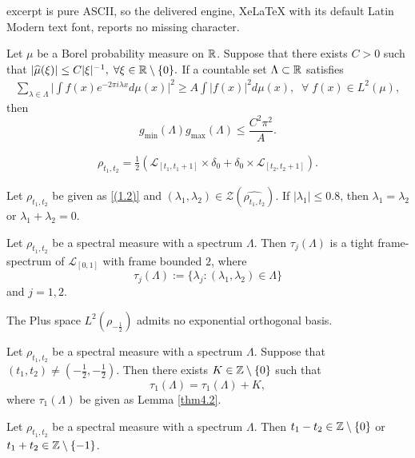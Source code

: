 \documentclass[10pt,a4paper]{amsart}
\begin{document}
excerpt is pure ASCII, so the delivered engine, XeLaTeX with its default Latin Modern text font, reports no missing character.
\begin{thm}\label{thm1.1}
	Let $\mu$ be a Borel probability measure on $\Bbb R$. 
	Suppose that there exists $C>0$ such that \( |\widehat{\mu}(\xi)|\leq C|\xi|^{-1},\;\forall\xi\in\Bbb R\setminus\{0\}. \) 
If a countable set \(\Lambda\subset\Bbb R\) satisfies 
\begin{align}\label{(1.1')}
	\sum_{\lambda\in\Lambda}\Big|\int f(x)e^{-2\pi i\lambda x}d\mu(x)\Big|^2\geq A
	\int |f(x)|^2d\mu(x),\;\;\forall\;f(x)\in L^2(\mu),
\end{align}
then 
	\[
	g_{\min}(\Lambda) g_{\max}(\Lambda)\leq \frac{C^2\pi^2}{A}.
	\] 
\end{thm}

\begin{align}\label{(1.2)}
	\rho_{t_1,t_2}=\frac{1}{2}(\mathcal{L}_{[t_1,t_1+1]}\times\delta_0+\delta_0\times\mathcal{L}_{[t_2,t_2+1]}).
\end{align}

\begin{lem}\label{thm4.1}
Let $\rho_{t_1,t_2}$ be given as \eqref{(1.2)} and  $(\lambda_1,\lambda_2)\in\mathcal{Z}(\widehat{\rho_{t_1,t_2}})$. 
If $|\lambda_1|\leq0.8$, then $\lambda_1=\lambda_2$ or $\lambda_1+\lambda_2=0$. 
\end{lem}

\begin{lem}\label{thm4.2}
	Let $\rho_{t_1,t_2}$ be a spectral measure with a spectrum $\Lambda$. 
	Then $\tau_j(\Lambda)$ is a tight frame-spectrum of $\mathcal{L}_{[0,1]}$ with frame bounded $2$, where $$\tau_j(\Lambda):=\{\lambda_j:(\lambda_1,\lambda_2)\in\Lambda\}  
	$$ and $j=1,2$. 
\end{lem}

\begin{prop}\label{thm4.3}
	The Plus space $L^2(\rho_{-\frac12})$ admits no exponential orthogonal basis. 
\end{prop}

\begin{lem}\label{thm4.4}
		Let $\rho_{t_1,t_2}$ be a spectral measure with a spectrum $\Lambda$. 
		Suppose that $(t_1,t_2)\neq(-\frac12,-\frac12)$.
	Then there exists $K\in\Bbb Z\setminus\{0\}$ such that  $$\tau_1(\Lambda)=\tau_1(\Lambda)+K, 
	$$ 
	where $\tau_1(\Lambda)$ be given as Lemma  \ref{thm4.2}.
\end{lem}

\begin{prop}\label{thm4.5}
		Let $\rho_{t_1,t_2}$ be a spectral measure with a spectrum $\Lambda$. 
 Then $t_1-t_2\in\Bbb Z\setminus\{0\}$ or $t_1+t_2\in\Bbb Z\setminus\{-1\}$. 
\end{prop}
\end{document}
